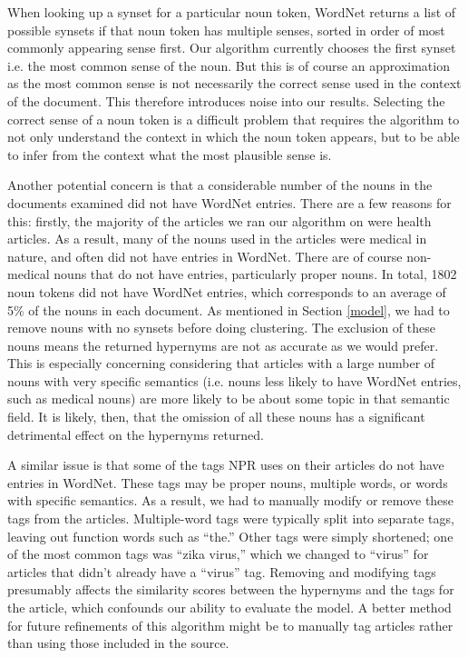 \documentclass[12pt]{article}
\begin{document}
When looking up a synset for a particular noun token, WordNet returns a list of possible synsets if that noun token has multiple senses, sorted in order of most commonly appearing sense first. Our algorithm currently chooses the first synset i.e. the most common sense of the noun. But this is of course an approximation as the most common sense is not necessarily the correct sense used in the context of the document. This therefore introduces noise into our results. Selecting the correct sense of a noun token is a difficult problem that requires the algorithm to not only understand the context in which the noun token appears, but to be able to infer from the context what the most plausible sense is.

Another potential concern is that a considerable number of the nouns in the documents examined did not have WordNet entries. There are a few reasons for this: firstly, the majority of the articles we ran our algorithm on were health articles. As a result, many of the nouns used in the articles were medical in nature, and often did not have entries in WordNet. There are of course non-medical nouns that do not have entries, particularly proper nouns. In total, 1802 noun tokens did not have WordNet entries, which corresponds to an average of 5\% of the nouns in each document. As mentioned in Section \ref{model}, we had to remove nouns with no synsets before doing clustering. The exclusion of these nouns means the returned hypernyms are not as accurate as we would prefer. This is especially concerning considering that articles with a large number of nouns with very specific semantics (i.e. nouns less likely to have WordNet entries, such as medical nouns) are more likely to be about some topic in that semantic field. It is likely, then, that the omission of all these nouns has a significant detrimental effect on the hypernyms returned.

A similar issue is that some of the tags NPR uses on their articles do not have entries in WordNet. These tags may be proper nouns, multiple words, or words with specific semantics. As a result, we had to manually modify or remove these tags from the articles. Multiple-word tags were typically split into separate tags, leaving out function words such as ``the.'' Other tags were simply shortened; one of the most common tags was ``zika virus,'' which we changed to ``virus'' for articles that didn't already have a ``virus'' tag. Removing and modifying tags presumably affects the similarity scores between the hypernyms and the tags for the article, which confounds our ability to evaluate the model. A better method for future refinements of this algorithm might be to manually tag articles rather than using those included in the source.

%
%


\end{document}

